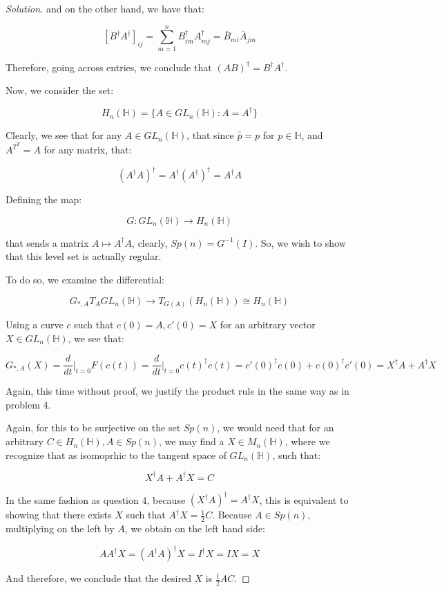 \documentclass[10pt]{article}
\begin{document}
\begin{proof}[Solution]
and on the other hand, we have that:

$$[B^\dag A^\dag]_{ij} = \sum_{m=1}^n B^\dag_{im} A^\dag_{mj} = \overline{B}_{mi} \overline{A}_{jm}$$

Therefore, going across entries, we conclude that $(AB)^\dag = B^\dag A^\dag$.

Now, we consider the set:

$$ H_n(\mathbb{H}) = \{ A \in GL_n(\mathbb{H}) : A = A^\dag \}$$

Clearly, we see that for any $A \in GL_n(\mathbb{H})$, that since $\overline{\overline{p}} = p$ for $p \in \mathbb{H}$, and $A^{T^T} = A$ for any matrix, that:

$$ (A^\dag A)^\dag = A^\dag (A^\dag)^\dag = A^\dag A $$

Defining the map:

$$ G: GL_n(\mathbb{H}) \to H_n(\mathbb{H}) $$

that sends a matrix $A \mapsto A^\dag A$, clearly, $Sp(n) = G^{-1}(I)$. So, we wish to show that this level set is actually regular.

To do so, we examine the differential:

$$ G_{*, A} T_A GL_n(\mathbb{H}) \to T_{G(A)}(H_n(\mathbb{H})) \cong H_n(\mathbb{H}) $$

Using a curve $c$ such that $c(0) = A, c'(0) = X$ for an arbitrary vector $X \in GL_n(\mathbb{H})$, we see that:

$$ G_{*, A}(X) = \frac{d}{dt} \bigg|_{t=0} F(c(t)) = \frac{d}{dt} \bigg|_{t=0} c(t)^\dag c(t) = c'(0)^\dag c(0) + c(0)^\dag c'(0)  = X^\dag A + A^\dag X$$

Again, this time without proof, we justify the product rule in the same way as in problem 4.

Again, for this to be surjective on the set $Sp(n)$, we would need that for an arbitrary $C \in H_n(\mathbb{H}), A \in Sp(n)$, we may find a $X \in M_n(\mathbb{H})$, where we recognize that as isomoprhic to the tangent space of $GL_n(\mathbb{H})$, such that:

$$ X^\dag A + A^\dag X = C$$

In the same fashion as question 4, because $(X^\dag A)^\dag = A^\dag X$, this is equivalent to showing that there exists $X$ such that $A^\dag X =\frac{1}{2} C$. Because $A \in Sp(n)$, multiplying on the left by $A$, we obtain on the left hand side:

$$ AA^\dag X = (A^\dag A)^\dag X = I^\dag X= IX = X $$

And therefore, we conclude that the desired $X$ is $\frac{1}{2} AC$.


\end{proof}
\end{document}
